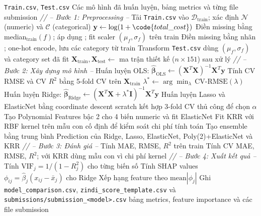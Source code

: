 \begin{algorithm}[H]
\caption{Data Fitting Pipeline --- Tanzania Tourism}
\begin{algorithmic}[1]
\Require \texttt{Train.csv}, \texttt{Test.csv}
\Ensure Các mô hình đã huấn luyện, bảng metrics và từng file submission
\Statex \textit{// -- Bước 1: Preprocessing --}
\State Tải \texttt{Train.csv} vào $\mathcal{D}_{\text{train}}$; xác định $\mathcal{N}$ (numeric) và $\mathcal{C}$ (categorical)
\State $\mathbf{y} \leftarrow \log(1 + \code{total\_cost})$ 
    \State Điền missing bằng median$_{\text{train}}(f)$; áp dụng ; fit scaler $(\mu_f, \sigma_f)$ trên train
\EndFor
{}
    \State Điền missing bằng nhãn ; one-hot encode, lưu các category từ train
\EndFor
\State Transform \texttt{Test.csv} dùng $(\mu_f, \sigma_f)$ và category set đã fit 
\State $\mathbf{X}_{\text{train}}, \mathbf{X}_{\text{test}} \leftarrow$ ma trận thiết kế ($n \times 151$) sau xử lý
\Statex \textit{// -- Bước 2: Xây dựng mô hình --}
\State Huấn luyện OLS: $\hat{\boldsymbol{\beta}}_{\text{OLS}} \leftarrow (\mathbf{X}^T\mathbf{X})^{-1}\mathbf{X}^T\mathbf{y}$
    \State Tính CV RMSE và CV $R^2$ bằng 5-fold CV trên $\mathbf{X}_{\text{train}}$
\EndFor
\State $\lambda^* \leftarrow \arg\min_{\lambda}\,\text{CV-RMSE}(\lambda)$ 
\State Huấn luyện Ridge: $\hat{\boldsymbol{\beta}}_{\text{Ridge}} \leftarrow (\mathbf{X}^T\mathbf{X} + \lambda^*\mathbf{I})^{-1}\mathbf{X}^T\mathbf{y}$
\State Huấn luyện Lasso và ElasticNet bằng coordinate descent scratch kết hợp 3-fold CV thủ công để chọn $\alpha$
\State Tạo Polynomial Features bậc 2 cho 4 biến numeric và fit ElasticNet
\State Fit KRR với RBF kernel trên mẫu con cố định để kiểm soát chi phí tính toán
\State Tạo ensemble bằng trung bình Prediction của Ridge, Lasso, ElasticNet, Poly(2)+ElasticNet và KRR
\Statex \textit{// -- Bước 3: Đánh giá --}
    \State Tính MAE, RMSE, $R^2$ trên train
    \State Tính CV MAE, RMSE, $R^2$; với KRR dùng mẫu con vì chi phí kernel
\EndFor
\Statex \textit{// -- Bước 4: Xuất kết quả --}
\State Tính $\text{VIF}_j = 1/(1 - R_j^2)$ cho từng biến số 
\State Tính SHAP values $\phi_{ij} = \hat{\beta}_j(x_{ij} - \bar{x}_j)$ cho Ridge
\State Xếp hạng feature theo $\text{mean}|\phi_j|$
\State Ghi \texttt{model\_comparison.csv}, \texttt{zindi\_score\_template.csv} và \texttt{submissions/submission\_<model>.csv}
\State \Return bảng metrics, feature importance và các file submission
\end{algorithmic}
\end{algorithm}

